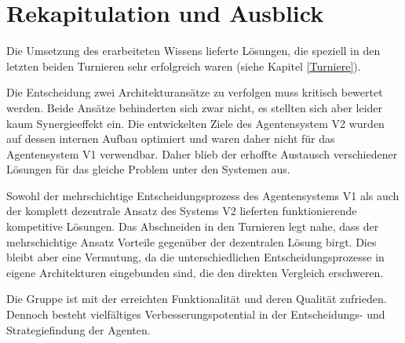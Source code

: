 \documentclass[runningheads]{llncs}
\begin{document}
\section{Rekapitulation und Ausblick}
Die Umsetzung des erarbeiteten Wissens lieferte Lösungen, die speziell in den letzten beiden Turnieren sehr erfolgreich waren (siehe Kapitel \ref{Turniere}).


Die Entscheidung zwei Architekturansätze zu verfolgen muss kritisch bewertet werden. Beide Ansätze behinderten sich zwar nicht, es stellten sich aber leider kaum Synergieeffekt ein. Die entwickelten Ziele des Agentensystem V2 wurden auf dessen internen Aufbau optimiert und waren daher nicht für das Agentensystem V1 verwendbar. Daher blieb der erhoffte Austausch verschiedener Lösungen für das gleiche Problem unter den Systemen aus.

Sowohl der mehrschichtige Entscheidungsprozess des Agentensystems V1 als auch der komplett dezentrale Ansatz des Systems V2 lieferten funktionierende kompetitive Lösungen. Das Abschneiden in den Turnieren legt nahe, dass der mehrschichtige Ansatz Vorteile gegenüber der dezentralen Lösung birgt. Dies bleibt aber eine Vermutung, da die unterschiedlichen Entscheidungsprozesse in eigene Architekturen eingebunden sind, die den direkten Vergleich erschweren.

Die Gruppe ist mit der erreichten Funktionalität und deren Qualität zufrieden. Dennoch besteht vielfältiges Verbesserungspotential in der Entscheidungs- und Strategiefindung der Agenten.
\end{document}

